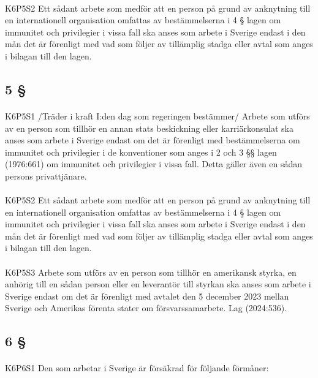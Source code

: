 \documentclass[a4paper,notitlepage,openany,10pt]{book}
\begin{document}
\paragraph*{}
{\tiny K6P5S2}
Ett sådant arbete som medför att en person på grund av anknytning till en internationell organisation omfattas av bestämmelserna i 4 § lagen om immunitet och privilegier i vissa fall ska anses som arbete i Sverige endast i den mån det är förenligt med vad som följer av tillämplig stadga eller avtal som anges i bilagan till den lagen.
\subsection*{5 §}
\paragraph*{}
{\tiny K6P5S1}
/Träder i kraft I:den dag som regeringen bestämmer/
Arbete som utförs av en person som tillhör en annan stats beskickning eller karriärkonsulat ska anses som arbete i Sverige endast om det är förenligt med bestämmelserna om immunitet och privilegier i de konventioner som anges i 2 och 3 §§ lagen (1976:661) om immunitet och privilegier i vissa fall. Detta gäller även en sådan persons privattjänare.
\paragraph*{}
{\tiny K6P5S2}
Ett sådant arbete som medför att en person på grund av anknytning till en internationell organisation omfattas av bestämmelserna i 4 § lagen om immunitet och privilegier i vissa fall ska anses som arbete i Sverige endast i den mån det är förenligt med vad som följer av tillämplig stadga eller avtal som anges i bilagan till den lagen.
\paragraph*{}
{\tiny K6P5S3}
Arbete som utförs av en person som tillhör en amerikansk styrka, en anhörig till en sådan person eller en leverantör till styrkan ska anses som arbete i Sverige endast om det är förenligt med avtalet den 5 december 2023 mellan Sverige och Amerikas förenta stater om försvarssamarbete.
Lag (2024:536).
\subsection*{6 §}
\paragraph*{}
{\tiny K6P6S1}
Den som arbetar i Sverige är försäkrad för följande förmåner:
\end{document}
